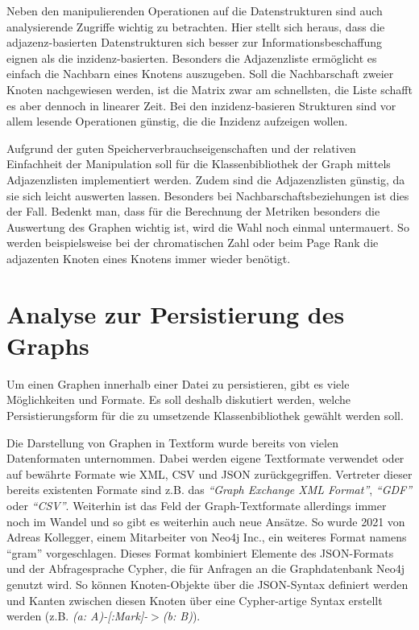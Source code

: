 \documentclass[a4paper,12pt,ngerman,chapterprefix=false,listof=totoc,bibliography=totoc]{scrreprt}
\begin{document}
{{{Neben den manipulierenden Operationen auf die Datenstrukturen sind auch analysierende Zugriffe wichtig zu betrachten. Hier stellt sich heraus, dass die adjazenz-basierten Datenstrukturen sich besser zur Informationsbeschaffung eignen als die inzidenz-basierten. Besonders die Adjazenzliste ermöglicht es einfach die Nachbarn eines Knotens auszugeben. Soll die Nachbarschaft zweier Knoten nachgewiesen werden, ist die Matrix zwar am schnellsten, die Liste schafft es aber dennoch in linearer Zeit. Bei den inzidenz-basieren Strukturen sind vor allem lesende Operationen günstig, die die Inzidenz aufzeigen wollen. \cite{bettilyon_implementations_2019}

Aufgrund der guten Speicherverbrauchseigenschaften und der relativen Einfachheit der Manipulation soll für die Klassenbibliothek der Graph mittels Adjazenzlisten implementiert werden. Zudem sind die Adjazenzlisten günstig, da sie sich leicht auswerten lassen. Besonders bei Nachbarschaftsbeziehungen ist dies der Fall. Bedenkt man, dass für die Berechnung der Metriken besonders die Auswertung des Graphen wichtig ist, wird die Wahl noch einmal untermauert. So werden beispielsweise bei der chromatischen Zahl oder beim Page Rank die adjazenten Knoten eines Knotens immer wieder benötigt.
}

\section{Analyse zur Persistierung des Graphs}
{
Um einen Graphen innerhalb einer Datei zu persistieren, gibt es viele Möglichkeiten und Formate. Es soll deshalb diskutiert werden, welche Persistierungsform für die zu umsetzende Klassenbibliothek gewählt werden soll.

Die Darstellung von Graphen in Textform wurde bereits von vielen Datenformaten unternommen. Dabei werden eigene Textformate verwendet oder auf bewährte Formate wie XML, CSV und JSON zurückgegriffen. Vertreter dieser bereits existenten Formate sind z.B. das \textit{"`Graph Exchange XML Format"'}, \textit{"`GDF"'} oder \textit{"`CSV"'}. \cite{gephi_supported_2017} Weiterhin ist das Feld der Graph-Textformate allerdings immer noch im Wandel und so gibt es weiterhin auch neue Ansätze. So wurde 2021 von Adreas Kollegger, einem Mitarbeiter von Neo4j Inc., ein weiteres Format namens "`gram"' vorgeschlagen. Dieses Format kombiniert Elemente des JSON-Formats und der Abfragesprache Cypher, die für Anfragen an die Graphdatenbank Neo4j genutzt wird. So können Knoten-Objekte über die JSON-Syntax definiert werden und Kanten zwischen diesen Knoten über eine Cypher-artige Syntax erstellt werden (z.B. \textit{(a: A)-[:Mark]-\(>\)(b: B)}). \cite{kollegger_gram_2021}

}}}
\end{document}
